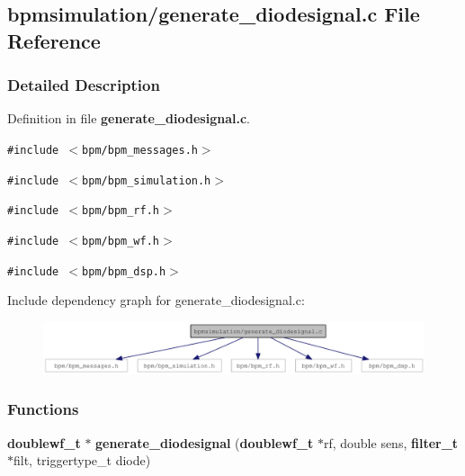 \subsection{bpmsimulation/generate\_\-diodesignal.c File Reference}
\label{generate__diodesignal_8c}


\subsubsection{Detailed Description}


Definition in file {\bf generate\_\-diodesignal.c}.

{\tt \#include $<$bpm/bpm\_\-messages.h$>$}\par
{\tt \#include $<$bpm/bpm\_\-simulation.h$>$}\par
{\tt \#include $<$bpm/bpm\_\-rf.h$>$}\par
{\tt \#include $<$bpm/bpm\_\-wf.h$>$}\par
{\tt \#include $<$bpm/bpm\_\-dsp.h$>$}\par


Include dependency graph for generate\_\-diodesignal.c:\nopagebreak
\begin{figure}[H]
\begin{center}
\leavevmode
\includegraphics[width=340pt]{generate__diodesignal_8c__incl}
\end{center}
\end{figure}
\subsubsection*{Functions}
\begin{CompactItemize}
\item 
{\bf doublewf\_\-t} $\ast$ {\bf generate\_\-diodesignal} ({\bf doublewf\_\-t} $\ast$rf, double sens, {\bf filter\_\-t} $\ast$filt, triggertype\_\-t diode)
\end{CompactItemize}
